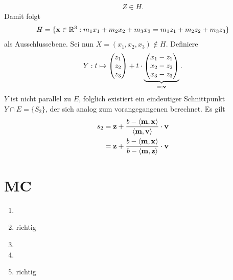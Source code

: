 \documentclass[11pt]{article}
\renewcommand{\vec}{\textbf}
\begin{document}
\begin{enumerate}
\begin{equation*}
	\begin{aligned}
	Z \in H.
	\end{aligned}
	\end{equation*}
	Damit folgt
	\begin{equation*}
	\begin{aligned}
	H = \lbrace \vec x \in \mathbb{R}^3 : m_1x_1 + m_2x_2 + m_3x_3 = m_1z_1 + m_2z_2 + m_3z_3 \rbrace
	\end{aligned}
	\end{equation*}
	als Ausschlussebene. Sei nun $ X = (x_1,x_2,x_3) \notin H $. Definiere
	\begin{equation*}
	\begin{aligned}
	Y : t \mapsto \begin{pmatrix}
	z_1 \\ z_2 \\ z_3
	\end{pmatrix} + t \cdot \underbrace{\begin{pmatrix}
	x_1 - z_1\\
	x_2 - z_2\\
	x_3 - z_3
	\end{pmatrix}}_{=:\vec v}.
	\end{aligned}
	\end{equation*}
	$ Y $ ist nicht parallel zu $ E $, folglich existiert ein eindeutiger Schnittpunkt $ Y \cap E = \lbrace S_2\rbrace $, der sich analog zum vorangegangenen berechnet. Es gilt
	\begin{equation*}
	\begin{aligned}
	s_2 &= \vec z + \frac{b - \langle \vec m,\vec x\rangle}{\langle \vec m, \vec v \rangle} \cdot \vec v\\
	&=\vec z + \frac{b - \langle \vec m,\vec x\rangle}{b - \langle \vec m, \vec z \rangle} \cdot \vec v
	\end{aligned}
	\end{equation*}
\end{enumerate}

\section*{MC}
\begin{enumerate}
	\item 
	\item richtig
	\item 
	\item 
	\item richtig
\end{enumerate}
\end{document}
